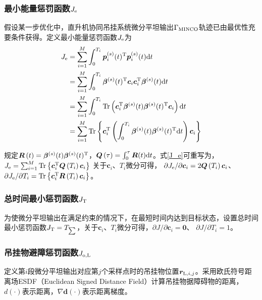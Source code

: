 \subsubsection{最小能量惩罚函数$J_{\rm{e}}$}
假设某一步优化中，直升机协同吊挂系统微分平坦输出$\Gamma_{\rm{MINCO}}$轨迹已由最优性充要条件获得。定义最小能量惩罚函数$J_{\rm{e}}$为
\begin{equation}\label{J_e}
    \begin{aligned}
        J_{\rm{e}} &= \sum\limits_{i=1}^M \int_{0}^{T_i}\boldsymbol{p}_i^{(s)}(t)^{\rm{T}}\boldsymbol{p}_i^{(s)}(t){\rm{d}}t\\
        & = \sum\limits_{i=1}^M\int_0^{T_i}\boldsymbol{\beta}^{(s)}(t)^{\rm{T}}\boldsymbol{c}_i\boldsymbol{c}_i^{\rm{T}}\boldsymbol{\beta}^{(s)}(t){\rm{d}}t\\
        & = \sum\limits_{i=1}^M\int_0^{T_i}{\rm{Tr}}\left(
            \boldsymbol{c}_i^{\rm{T}}\boldsymbol{\beta}^{(s)}(t)\boldsymbol{\beta}^{(s)}(t){\rm{^T}}\boldsymbol{c}_i \right)
            {\rm{d}}t\\
        & = \sum\limits_{i=1}^M{\rm{Tr}}\left\{
        \boldsymbol{c}_i^{\rm{T}}\left( \int_0^{T_i} \boldsymbol{\beta}^{(s)}(t)\boldsymbol{\beta}^{(s)}(t)^{\rm{T}}{\rm{d}}t \right)\boldsymbol{c}_i
        \right\}
    \end{aligned}
\end{equation}

规定$\boldsymbol{R}\left(t\right) = \boldsymbol{\beta}^{(s)}(t)\boldsymbol{\beta}^{(s)}(t)^{\rm{T}}$，$\boldsymbol{Q}\left(\tau \right) = \int_0^{\tau} \boldsymbol{R}(t){\rm{d}}t$。式\ref{J_e}可重写为，$J_{\rm{e}} =\sum\nolimits_{i=1}^M {\rm{Tr}}\left\{\boldsymbol{c}_i^{\rm{T}}\boldsymbol{Q}\left(T_i\right)\boldsymbol{c}_i\right\}$
关于$\boldsymbol{c}_i$、$T_i$微分可得，
${\partial J_{\rm{e}}}/{\partial \boldsymbol{c}_i}  = 2\boldsymbol{Q}\left(T_i\right)\boldsymbol{c}_i$、$
            {\partial J_{\rm{e}}}/{\partial T_i} = {\rm{Tr}}\left\{
            \boldsymbol{c}_i^{\rm{T}}\boldsymbol{R}\left(T_i\right)\boldsymbol{c}_i
            \right\}$。

\subsubsection{总时间最小惩罚函数$J_{\rm{T}}$}
为使微分平坦输出在满足约束的情况下，在最短时间内达到目标状态，设置总时间最小惩罚函数$J_{\rm{T}} = T_{\sum}$，关于$\boldsymbol{c}_i$、$T_i$微分可得，${\partial J}/{\partial \boldsymbol{c}_i} = \boldsymbol{0}$、 ${\partial J}/{\partial T_i} = 1$。
\subsubsection{吊挂物避障惩罚函数$J_{\rm{o,L}}$}
定义第$i$段微分平坦输出对应第$j$个采样点时的吊挂物位置${\boldsymbol{r}}_{{\rm{L}},i,j}$。采用欧氏符号距离场ESDF（Euclidean Signed Distance Field）计算吊挂物据障碍物的距离，$d(\cdot)$表示距离，$\nabla \boldsymbol{d}(\cdot)$表示距离梯度。

